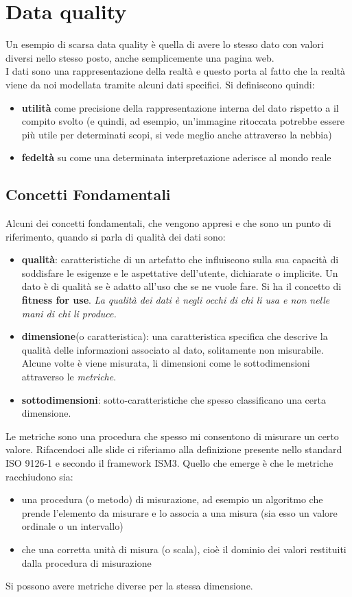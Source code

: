 \section{Data quality}
Un esempio di scarsa data quality è quella di avere lo stesso dato con valori diversi nello stesso posto, anche semplicemente una pagina web.\\ 
I dati sono una rappresentazione della realtà e questo porta al fatto che la realtà viene da noi modellata tramite alcuni dati specifici. Si definiscono quindi:
\begin{itemize}
  \item \textbf{utilità} come precisione della rappresentazione interna del dato rispetto a il compito svolto (e quindi, ad esempio, un'immagine ritoccata potrebbe essere più utile per determinati scopi, si vede meglio anche attraverso la nebbia)
  \item \textbf{fedeltà} su come una determinata interpretazione aderisce al mondo reale
\end{itemize}
\subsection{Concetti Fondamentali}
Alcuni dei concetti fondamentali, che vengono appresi e che sono un punto di riferimento, quando si parla di qualità dei dati sono:
\begin{itemize}
    \item \textbf{qualità}: caratteristiche di un artefatto che influiscono sulla sua capacità di soddisfare le esigenze e le aspettative dell'utente, dichiarate o implicite. Un dato è di qualità se è adatto all'uso che se ne vuole fare. Si ha il concetto di \textbf{fitness for use}. \textit{ La qualità dei dati è negli occhi di chi li usa e non nelle mani di chi li produce.}
    \item \textbf{dimensione}(o caratteristica): una caratteristica specifica che descrive la qualità delle informazioni associato al dato, solitamente non misurabile. Alcune volte è viene misurata, li dimensioni come le sottodimensioni attraverso le \textit{metriche}.
    \item \textbf{sottodimensioni}: sotto-caratteristiche che spesso classificano una certa dimensione.
\end{itemize}
Le metriche sono una procedura che spesso mi consentono di misurare un certo valore. Rifacendoci alle slide ci riferiamo alla definizione presente nello standard ISO 9126-1 e secondo il framework ISM3. Quello che emerge è che le metriche racchiudono sia:
\begin{itemize}
    \item una procedura (o metodo) di misurazione, ad esempio un algoritmo che prende l'elemento da misurare e lo associa a una misura (sia esso un valore ordinale o un intervallo) 
    \item che una corretta unità di misura (o scala), cioè il dominio dei valori restituiti dalla procedura di misurazione
\end{itemize}
Si possono avere metriche diverse per la stessa dimensione.

